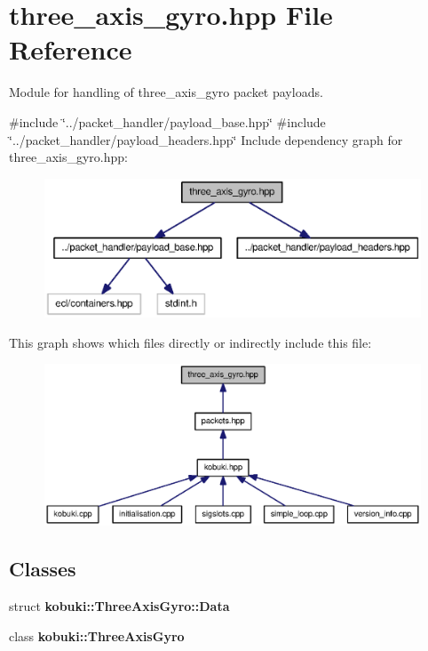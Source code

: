 \section{three\-\_\-axis\-\_\-gyro.\-hpp \-File \-Reference}
\label{three__axis__gyro_8hpp}


\-Module for handling of three\-\_\-axis\-\_\-gyro packet payloads.  


{\ttfamily \#include \char`\"{}../packet\-\_\-handler/payload\-\_\-base.\-hpp\char`\"{}}\*
{\ttfamily \#include \char`\"{}../packet\-\_\-handler/payload\-\_\-headers.\-hpp\char`\"{}}\*
\-Include dependency graph for three\-\_\-axis\-\_\-gyro.\-hpp\-:
\nopagebreak
\begin{figure}[H]
\begin{center}
\leavevmode
\includegraphics[width=350pt]{three__axis__gyro_8hpp__incl}
\end{center}
\end{figure}
\-This graph shows which files directly or indirectly include this file\-:
\nopagebreak
\begin{figure}[H]
\begin{center}
\leavevmode
\includegraphics[width=350pt]{three__axis__gyro_8hpp__dep__incl}
\end{center}
\end{figure}
\subsection*{\-Classes}
\begin{DoxyCompactItemize}
\item 
struct {\bf kobuki\-::\-Three\-Axis\-Gyro\-::\-Data}
\item 
class {\bf kobuki\-::\-Three\-Axis\-Gyro}
\end{DoxyCompactItemize}
